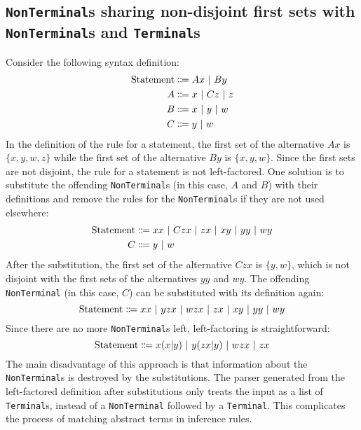 \subsection{\texorpdfstring{\lstinline{NonTerminal}}{NonTerminal}s sharing non-disjoint first sets with \texorpdfstring{\lstinline{NonTerminal}}{NonTerminal}s and \mbox{\texorpdfstring{\lstinline{Terminal}}{Terminal}s}}
\label{syntax:factorisation:nonterm}
Consider the following syntax definition:
\begin{align*}
    \text{Statement} &\Coloneqq Ax \ |\  By \\
    A &\Coloneqq x \ |\  Cz \ |\  z \\
    B &\Coloneqq x \ |\  y \ |\  w \\
    C &\Coloneqq y \ |\  w
\end{align*}
In the definition of the rule for a statement, the first set of the alternative $Ax$ is $\{ x, y, w, z \}$ while the first set of the alternative $By$ is $\{ x, y, w \}$. Since the first sets are not disjoint, the rule for a statement is not left-factored. One solution is to substitute the offending \lstinline{NonTerminal}s (in this case, $A$ and $B$) with their definitions and remove the rules for the \lstinline{NonTerminal}s if they are not used elsewhere:
\begin{align*}
    \text{Statement} &\Coloneqq xx \ |\  Czx \ |\  zx \ |\  xy \ |\  yy \ |\  wy \\
    C &\Coloneqq y \ |\  w
\end{align*}
After the substitution, the first set of the alternative $Czx$ is $\{ y, w \}$, which is not disjoint with the first sets of the alternatives $yy$ and $wy$. The offending \lstinline{NonTerminal} (in this case, $C$) can be substituted with its definition again:
\[
    \text{Statement} \Coloneqq xx \ |\  yzx \ |\  wzx \ |\  zx \ |\  xy \ |\  yy \ |\  wy
\]
Since there are no more \lstinline{NonTerminal}s left, left-factoring is straightforward:
\[
    \text{Statement} \Coloneqq x(x|y) \ |\  y(zx|y) \ |\  wzx \ |\  zx
\]
The main disadvantage of this approach is that information about the \lstinline{NonTerminal}s is destroyed by the substitutions. The parser generated from the left-factored definition after substitutions only treats the input as a list of \lstinline{Terminal}s, instead of a \lstinline{NonTerminal} followed by a \lstinline{Terminal}. This complicates the process of matching abstract terms in inference rules.

